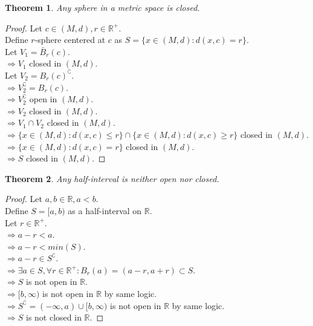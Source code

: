 \documentclass{article}
\newtheorem{theorem}{Theorem}[section]
\begin{document}
			\begin{theorem}
				Any sphere in a metric space is closed.
			\end{theorem}
			\begin{proof} 
				Let $c \in (M, d), r \in \mathbb{R}^+$.\\
				Define $r$-sphere centered at $c$ as $S = \{x \in (M, d): d(x, c) = r \}$.\\
				Let $V_1 = \bar{B}_{r}(c)$.\\
				$\Rightarrow V_1$ closed in $(M, d)$.\\
				Let $V_2 = B_{r}(c)^\complement$.\\
				$\Rightarrow V_2^\complement = B_{r}(c)$.\\
				$\Rightarrow V_2^\complement$ open in $(M, d)$.\\
				$\Rightarrow V_2$ closed in $(M, d)$.\\
				$\Rightarrow V_1 \cap V_2$ closed in $(M, d)$.\\
				$\Rightarrow \{x \in (M, d): d(x, c) \leq r \} \cap \{x \in (M, d): d(x, c) \geq r \}$ closed in $(M, d)$.\\
				$\Rightarrow \{x \in (M, d): d(x, c) = r \}$ closed in $(M, d)$.\\
				$\Rightarrow S$ closed in $(M, d)$.
			\end{proof}
			\begin{theorem}
				Any half-interval is neither open nor closed.
			\end{theorem}
			\begin{proof} 
				Let $a, b \in \mathbb{R}, a < b$.\\
				Define $S = [a, b)$ as a half-interval on $\mathbb{R}$.\\
				Let $r \in \mathbb{R}^+$.\\
				$\Rightarrow a - r < a$.\\
				$\Rightarrow a - r < min(S)$.\\
				$\Rightarrow a - r \in S^\complement$.\\
				$\Rightarrow \exists a \in S, \forall r \in \mathbb{R}^{+}: B_{r}(a) = (a - r, a + r) \subset S$.\\
				$\Rightarrow S$ is not open in $\mathbb{R}$.\\
				$\Rightarrow [b, \infty)$ is not open in $\mathbb{R}$ by same logic.\\
				$\Rightarrow S^\complement = (-\infty, a) \cup [b, \infty)$ is not open in $\mathbb{R}$ by same logic.\\
				$\Rightarrow S$ is not closed in $\mathbb{R}$.
			\end{proof}
\end{document}
